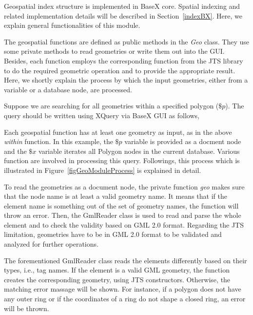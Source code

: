 \documentclass[a4paper,12pt]{article}
\begin{document}
Geospatial index structure is implemented in BaseX core. Spatial indexing and related implementation details will be described in Section~\ref{indexBX}. Here, we explain general functionalities of this module.

The geospatial functions are defined as public methods in the \textit{Geo} class. They use some private methods to read geometries or write them out into the GUI. Besides, each function employs the corresponding function from the JTS library to do the required geometric operation and to provide the appropriate result. Here, we shortly explain the process by which the input geometries, either from a variable or a database node, are processed.


Suppose we are searching for all geometries within a specified polygon ($\$p$). The query should be written using XQuery via BaseX GUI as follows,
\vspace{10px}
\vspace{10px}
Each geospatial function has at least one geometry as input, as in the above \textit{within} function. In this example, the $\$p$ variable is provided as a docment node and the $\$x$ variable iterates all Polygon nodes in the current database. Various function are involved in processing this query. Followings, this process which is illustrated in Figure~\ref{figGeoModuleProcess} is explained in detail. 

To read the geometries as a document node, the private function \textit{geo} makes sure that the node name is at least a valid geometry name. It means that if the element name is something out of the set of geometry names, the function will throw an error. 
Then, the GmlReader class is used to read and parse the whole element and to check the validity based on GML 2.0 format. Regarding the JTS limitation, geometries have to be in GML 2.0 format to be validated and analyzed for further operations. 

The forementioned GmlReader class reads the elements differently based on their types, i.e., tag names. If the element is a valid GML geometry, the function creates the corresponding geometry, using JTS constructors. Otherwise, the matching error massage will be shown. For instance, if a polygon does not have any outer ring or if the coordinates of a ring do not shape a closed ring, an error will be thrown. 
\end{document}
